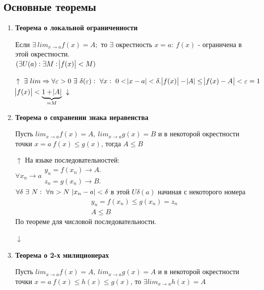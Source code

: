 \documentclass{article}
\begin{document}
  \subsection{Основные теоремы}
  \begin{enumerate}
    \item \textbf{Теорема о локальной ограниченности}

    Если \(\exists\ lim_{x \rightarrow a} f(x) = A;\) то \(\exists\) окрестность \(x = a:\ f(x)\) - ограничена в этой окрестности. \\
    \( (\exists U(a): \exists M: \abs{f(x)} < M) \)

    \(\uparrow\ \exists\ lim \Rightarrow \forall \varepsilon > 0\ \exists\ \delta(\varepsilon):\ \forall x:\ 0 < \abs{x-a} < \delta.\\ \abs{f(x)}-\abs{A} \leq \abs{f(x)-A}<\varepsilon=1\)\\
    \(\abs{f(x)}< \underbrace{1+\abs{A}}_{=M}\ \downarrow\)

    \item \textbf{Теорема о сохранении знака неравенства}

    Пусть \( lim_{x \rightarrow a} f(x) = A,\ lim_{x \rightarrow a} g(x) = B \) и в некоторой окрестности точки \(x = a\ f(x) \leq g(x)\), тогда \( A \leq B \)

    \(\uparrow\) На языке последовательностей:\\
    \(\forall x_n \rightarrow a \begin{array}{l} y_n = f(x_n) \rightarrow A.\\ z_n = g(x_n) \rightarrow B. \end{array}\)\\
    \(\forall \delta\ \exists\ N:\ \forall n > N\ \abs{x_n - a} < \delta\) в этой \(U \delta(a)\) начиная с некоторого номера
    \begin{equation*}
      \begin{array}{l}
        y_n = f(x_n) \leq g(x_n) = z_n \\
        A \leq B
      \end{array}
    \end{equation*}
    По теореме для числовой последовательности.

    \(\downarrow\)

    \item \textbf{Теорема о 2-х милиционерах}
    
    Пусть \( lim_{x \rightarrow a} f(x) = A,\ lim_{x \rightarrow a} g(x) = A \) и в некоторой окрестности точки \(x = a\ f(x) \leq h(x) \leq g(x)\), то \(\exists lim_{x \rightarrow a} h(x) = A\)


\end{enumerate}
\end{document}
